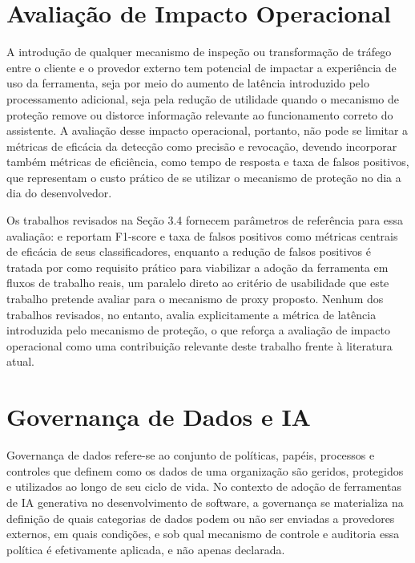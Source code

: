 \section{Avaliação de Impacto Operacional}

A introdução de qualquer mecanismo de inspeção ou transformação de tráfego entre o cliente e o provedor externo tem potencial de impactar a experiência de uso da ferramenta, seja por meio do aumento de latência introduzido pelo processamento adicional, seja pela redução de utilidade quando o mecanismo de proteção remove ou distorce informação relevante ao funcionamento correto do assistente. A avaliação desse impacto operacional, portanto, não pode se limitar a métricas de eficácia da detecção como precisão e revocação, devendo incorporar também métricas de eficiência, como tempo de resposta e taxa de falsos positivos, que representam o custo prático de se utilizar o mecanismo de proteção no dia a dia do desenvolvedor.

Os trabalhos revisados na Seção 3.4 fornecem parâmetros de referência para essa avaliação:  e  reportam F1-score e taxa de falsos positivos como métricas centrais de eficácia de seus classificadores, enquanto a redução de falsos positivos é tratada por  como requisito prático para viabilizar a adoção da ferramenta em fluxos de trabalho reais, um paralelo direto ao critério de usabilidade que este trabalho pretende avaliar para o mecanismo de proxy proposto. Nenhum dos trabalhos revisados, no entanto, avalia explicitamente a métrica de latência introduzida pelo mecanismo de proteção, o que reforça a avaliação de impacto operacional como uma contribuição relevante deste trabalho frente à literatura atual.

\section{Governança de Dados e IA}

Governança de dados refere-se ao conjunto de políticas, papéis, processos e controles que definem como os dados de uma organização são geridos, protegidos e utilizados ao longo de seu ciclo de vida. No contexto de adoção de ferramentas de IA generativa no desenvolvimento de software, a governança se materializa na definição de quais categorias de dados podem ou não ser enviadas a provedores externos, em quais condições, e sob qual mecanismo de controle e auditoria essa política é efetivamente aplicada, e não apenas declarada.

